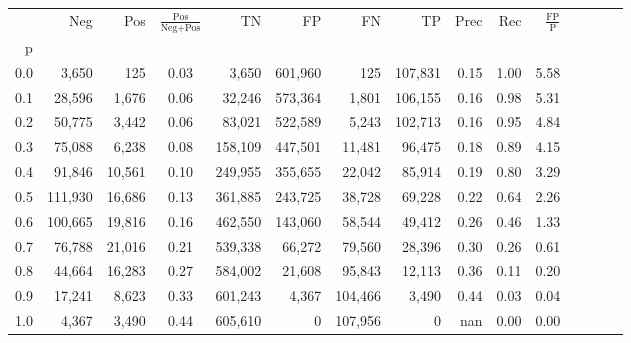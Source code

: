 \begin{tabular}{rrrcrrrrrrrrrrr}
\toprule
{} &      Neg &     Pos & $\frac{\text{Pos}}{\text{Neg}+\text{Pos}}$ &       TN &       FP &       FN &       TP &  Prec &   Rec & $\frac{\text{FP}}{\text{P}}$ \\
p   &          &         &                                            &          &          &          &          &       &       &                              \\
\midrule
0.0 &    3,650 &     125 &                                       0.03 &    3,650 &  601,960 &      125 &  107,831 &  0.15 &  1.00 &                         5.58 \\
0.1 &   28,596 &   1,676 &                                       0.06 &   32,246 &  573,364 &    1,801 &  106,155 &  0.16 &  0.98 &                         5.31 \\
0.2 &   50,775 &   3,442 &                                       0.06 &   83,021 &  522,589 &    5,243 &  102,713 &  0.16 &  0.95 &                         4.84 \\
0.3 &   75,088 &   6,238 &                                       0.08 &  158,109 &  447,501 &   11,481 &   96,475 &  0.18 &  0.89 &                         4.15 \\
0.4 &   91,846 &  10,561 &                                       0.10 &  249,955 &  355,655 &   22,042 &   85,914 &  0.19 &  0.80 &                         3.29 \\
0.5 &  111,930 &  16,686 &                                       0.13 &  361,885 &  243,725 &   38,728 &   69,228 &  0.22 &  0.64 &                         2.26 \\
0.6 &  100,665 &  19,816 &                                       0.16 &  462,550 &  143,060 &   58,544 &   49,412 &  0.26 &  0.46 &                         1.33 \\
0.7 &   76,788 &  21,016 &                                       0.21 &  539,338 &   66,272 &   79,560 &   28,396 &  0.30 &  0.26 &                         0.61 \\
0.8 &   44,664 &  16,283 &                                       0.27 &  584,002 &   21,608 &   95,843 &   12,113 &  0.36 &  0.11 &                         0.20 \\
0.9 &   17,241 &   8,623 &                                       0.33 &  601,243 &    4,367 &  104,466 &    3,490 &  0.44 &  0.03 &                         0.04 \\
1.0 &    4,367 &   3,490 &                                       0.44 &  605,610 &        0 &  107,956 &        0 &   nan &  0.00 &                         0.00 \\
\bottomrule
\end{tabular}
